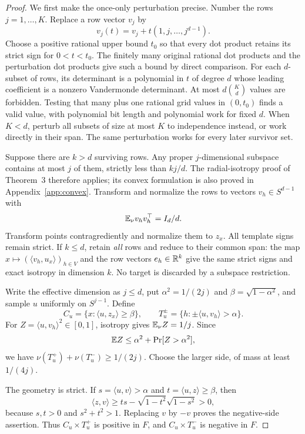 \begin{proof}
We first make the once-only perturbation precise. Number the rows $j=1,\ldots,K$. Replace a row vector $v_j$ by
\[
 v_j(t)=v_j+t(1,j,\ldots,j^{d-1}).
\]
Choose a positive rational upper bound $t_0$ so that every dot product retains its strict sign for $0<t<t_0$. The finitely many original rational dot products and the perturbation dot products give such a bound by direct comparison. For each $d$-subset of rows, its determinant is a polynomial in $t$ of degree $d$ whose leading coefficient is a nonzero Vandermonde determinant. At most $d\binom Kd$ values are forbidden. Testing that many plus one rational grid values in $(0,t_0)$ finds a valid value, with polynomial bit length and polynomial work for fixed $d$. When $K<d$, perturb all subsets of size at most $K$ to independence instead, or work directly in their span. The same perturbation works for every later survivor set.

Suppose there are $k>d$ surviving rows. Any proper $j$-dimensional subspace contains at most $j$ of them, strictly less than $kj/d$. The radial-isotropy proof of Theorem~3 therefore applies; its convex formulation is also proved in Appendix~\ref{app:convex}. Transform and normalize the rows to vectors $v_h\in S^{d-1}$ with
\[
 \mathbb E_\nu v_hv_h^\top=I_d/d.
\]
Transform points contragrediently and normalize them to $z_x$. All template signs remain strict. If $k\le d$, retain \emph{all} rows and reduce to their common span: the map $x\mapsto (\langle v_h,u_x\rangle)_{h\in V}$ and the row vectors $e_h\in\mathbb R^k$ give the same strict signs and exact isotropy in dimension $k$. No target is discarded by a subspace restriction.

Write the effective dimension as $j\le d$, put $\alpha^2=1/(2j)$ and $\beta=\sqrt{1-\alpha^2}$, and sample $u$ uniformly on $S^{j-1}$. Define
\[
 C_u=\{x:\langle u,z_x\rangle\ge\beta\},\qquad
 T_u^\pm=\{h:\pm\langle u,v_h\rangle>\alpha\}.
\]
For $Z=\langle u,v_h\rangle^2\in[0,1]$, isotropy gives $\mathbb E_\nu Z=1/j$. Since
\[
 \mathbb E Z\le\alpha^2+\Pr[Z>\alpha^2],
\]
we have $\nu(T_u^+)+\nu(T_u^-)\ge1/(2j)$. Choose the larger side, of mass at least $1/(4j)$.

The geometry is strict. If $s=\langle u,v\rangle>\alpha$ and $t=\langle u,z\rangle\ge\beta$, then
\[
 \langle z,v\rangle\ge ts-\sqrt{1-t^2}\sqrt{1-s^2}>0,
\]
because $s,t>0$ and $s^2+t^2>1$. Replacing $v$ by $-v$ proves the negative-side assertion. Thus $C_u\times T_u^+$ is positive in $F$, and $C_u\times T_u^-$ is negative in $F$.


\end{proof}
